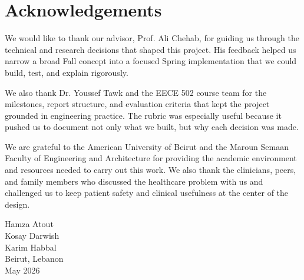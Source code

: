 \chapter*{Acknowledgements}

We would like to thank our advisor, Prof. Ali Chehab, for guiding us through the technical and research decisions that shaped this project. His feedback helped us narrow a broad Fall concept into a focused Spring implementation that we could build, test, and explain rigorously.

We also thank Dr. Youssef Tawk and the EECE 502 course team for the milestones, report structure, and evaluation criteria that kept the project grounded in engineering practice. The rubric was especially useful because it pushed us to document not only what we built, but why each decision was made.

We are grateful to the American University of Beirut and the Maroun Semaan Faculty of Engineering and Architecture for providing the academic environment and resources needed to carry out this work. We also thank the clinicians, peers, and family members who discussed the healthcare problem with us and challenged us to keep patient safety and clinical usefulness at the center of the design.

\hspace{1.5cm}

Hamza Atout\\
Kosay Darwish\\
Karim Habbal\\
Beirut, Lebanon\\
May 2026
